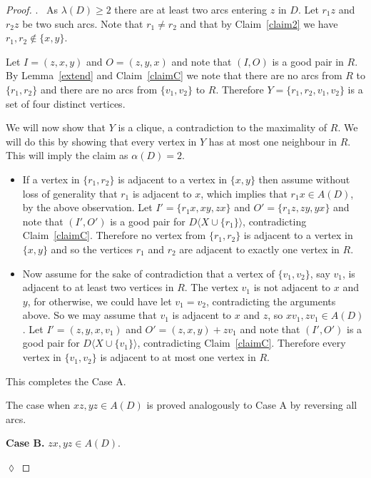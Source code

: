 \documentclass{article}
\theoremstyle{definition}
\newcommand{\induce}[2]{#1\langle #2 \rangle}
\newcommand{\2}{\vspace{0.2cm}}
\newenvironment{subproof}{\par\noindent {\it Proof}.\ }{\hfill$\lozenge$\par\vspace{11pt}}
\begin{document}
\begin{proof}
\begin{subproof}
As $\lambda(D) \geq 2$ there are at least two arcs entering $z$ in
$D$.  Let $r_1z$ and $r_2z$ be two such arcs. Note that $r_1 \not=
r_2$ and that by Claim~\ref{claim2} we have $r_1,r_2\notin \{x,y\}$.

Let $I=(z,x,y)$ and $O=(z,y,x)$ and note that $(I,O)$ is a good pair
in $R$.  By Lemma~\ref{extend} and Claim~\ref{claimC} we note that
there are no arcs from $R$ to $\{r_1,r_2\}$ and there are no arcs from
$\{v_1,v_2\}$ to $R$.  Therefore $Y=\{r_1,r_2,v_1,v_2\}$ is a set of
four distinct vertices.

We will now show that $Y$ is a clique, a contradiction to the
maximality of $R$. We will do this by showing that every vertex in $Y$
has at most one neighbour in $R$. This will imply the claim as
$\alpha{}(D)=2$.

\begin{itemize}
\item If a vertex in $\{r_1,r_2\}$ is adjacent to a vertex in
  $\{x,y\}$ then assume without loss of generality that $r_1$ is
  adjacent to $x$, which implies that $r_1 x \in A(D)$, by the above
  observation.  Let $I' = \{r_1x,xy,zx\}$ and $O'=\{r_1z,zy,yx\}$ and
  note that $(I',O')$ is a good pair for $\induce{D}{X \cup \{r_1\}}$,
  contradicting Claim~\ref{claimC}.  Therefore no vertex from
  $\{r_1,r_2\}$ is adjacent to a vertex in $\{x,y\}$ and so the
  vertices $r_1$ and $r_2$ are adjacent to exactly one vertex in $R$.

\item Now assume for the sake of contradiction that a vertex of
  $\{v_1, v_2\}$, say $v_1$, is adjacent to at least two vertices in
  $R$. The vertex $v_1$ is not adjacent to $x$ and $y$, for otherwise,
  we could have let $v_1=v_2$, contradicting the arguments above.  So
  we may assume that $v_1$ is adjacent to $x$ and $z$, so $xv_1, z v_1
  \in A(D)$.  Let $I' = (z,y,x,v_1)$ and $O'= (z, x,y) + zv_1$ and
  note that $(I',O')$ is a good pair for $\induce{D}{X \cup \{v_1\}}$,
  contradicting Claim~\ref{claimC}. Therefore every vertex in
  $\{v_1,v_2\}$ is adjacent to at most one vertex in $R$.
\end{itemize}
This completes the Case A. 

\2 The case when $xz,yz \in A(D)$ is proved analogously to Case A by
reversing all arcs.


\2

{\bf Case B.}  $zx,yz \in A(D)$.

\2


\end{subproof}
\end{proof}
\end{document}
